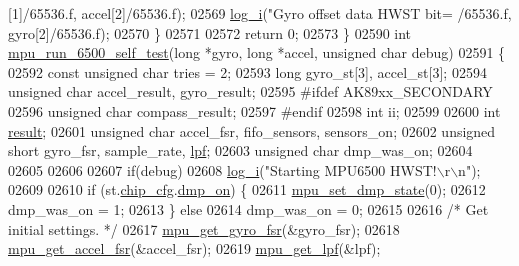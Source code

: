 \begin{DoxyCode}
{{{{{{{{{{{{{{{{{{{{{{{{{{{{{{      [1]/65536.f, accel[2]/65536.f);
02569         \hyperlink{inv__mpu_8c_a67fc07fa528d8e62dc7b88a847b563f5}{log\_i}(\textcolor{stringliteral}{"Gyro offset data HWST bit=%
      /65536.f, gyro[2]/65536.f);
02570     \}
02571 
02572     \textcolor{keywordflow}{return} 0;
02573 \}
02590 \textcolor{keywordtype}{int} \hyperlink{group___d_r_i_v_e_r_s_gac22890157bd3f7cc3752c0342f105b72}{mpu\_run\_6500\_self\_test}(\textcolor{keywordtype}{long} *gyro, \textcolor{keywordtype}{long} *accel, \textcolor{keywordtype}{unsigned} \textcolor{keywordtype}{char} debug)
02591 \{
02592     \textcolor{keyword}{const} \textcolor{keywordtype}{unsigned} \textcolor{keywordtype}{char} tries = 2;
02593     \textcolor{keywordtype}{long} gyro\_st[3], accel\_st[3];
02594     \textcolor{keywordtype}{unsigned} \textcolor{keywordtype}{char} accel\_result, gyro\_result;
02595 \textcolor{preprocessor}{#ifdef AK89xx\_SECONDARY}
02596     \textcolor{keywordtype}{unsigned} \textcolor{keywordtype}{char} compass\_result;
02597 \textcolor{preprocessor}{#endif}
02598     \textcolor{keywordtype}{int} ii;
02599 
02600     \textcolor{keywordtype}{int} \hyperlink{sensor_8h_a4c9d9cb8bb9d2b707a152051408f40e5}{result};
02601     \textcolor{keywordtype}{unsigned} \textcolor{keywordtype}{char} accel\_fsr, fifo\_sensors, sensors\_on;
02602     \textcolor{keywordtype}{unsigned} \textcolor{keywordtype}{short} gyro\_fsr, sample\_rate, \hyperlink{structgyro__reg__s_a0a4067140c6a3704b4312ba62b77aadb}{lpf};
02603     \textcolor{keywordtype}{unsigned} \textcolor{keywordtype}{char} dmp\_was\_on;
02604 
02605 
02606 
02607     \textcolor{keywordflow}{if}(debug)
02608         \hyperlink{inv__mpu_8c_a67fc07fa528d8e62dc7b88a847b563f5}{log\_i}(\textcolor{stringliteral}{"Starting MPU6500 HWST!\(\backslash\)r\(\backslash\)n"});
02609 
02610     \textcolor{keywordflow}{if} (st.\hyperlink{structgyro__state__s_ac895217592e2084bd520b0be8e9d20ee}{chip\_cfg}.\hyperlink{structchip__cfg__s_a49fb51079238683b21264827348b5968}{dmp\_on}) \{
02611         \hyperlink{group___d_r_i_v_e_r_s_ga68ed20e6c9663cd7c50469329af8715f}{mpu\_set\_dmp\_state}(0);
02612         dmp\_was\_on = 1;
02613     \} \textcolor{keywordflow}{else}
02614         dmp\_was\_on = 0;
02615 
02616     \textcolor{comment}{/* Get initial settings. */}
02617     \hyperlink{group___d_r_i_v_e_r_s_gaf973c32c73ba912ff512aab948fc31ca}{mpu\_get\_gyro\_fsr}(&gyro\_fsr);
02618     \hyperlink{group___d_r_i_v_e_r_s_gab6087a15ee23db23b6aec41590329a60}{mpu\_get\_accel\_fsr}(&accel\_fsr);
02619     \hyperlink{group___d_r_i_v_e_r_s_gaa95c7e216dcb2d888e9796001ca555f8}{mpu\_get\_lpf}(&lpf);
}}}}}}}}}}}}}}}}}}}}}}}}}}}}}}}
\end{DoxyCode}
